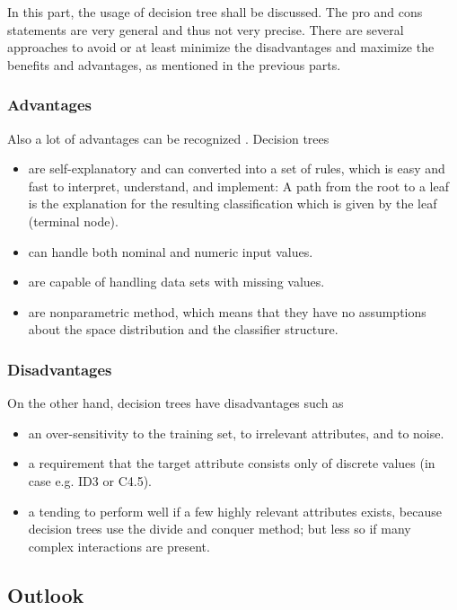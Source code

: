 In this part, the usage of decision tree shall be discussed. The pro and cons statements are very general and thus not very precise. There are several approaches to avoid or at least minimize the disadvantages and maximize the benefits and advantages, as mentioned in the previous parts.


\subsubsection{Advantages}

Also a lot of advantages can be recognized \cite[p. 73ff.]{rokach2008data}. Decision trees
\begin{itemize}
    \item are self-explanatory and can converted into a set of rules, which is easy and fast to interpret, understand, and implement: A path from the root to a leaf is the explanation for the resulting classification which is given by the leaf (terminal node). 
    \item can handle both nominal and numeric input values.
    \item are capable of handling data sets with missing values.
    \item are nonparametric method, which means that they have no assumptions about the space distribution and the classifier structure. 
\end{itemize}


\subsubsection{Disadvantages}
On the other hand, decision trees have disadvantages such as 
\begin{itemize}
    \item an over-sensitivity to the training set, to irrelevant attributes, and to noise.
    \item a requirement that the target attribute consists only of discrete values (in case e.g. ID3 or C4.5).
    \item a tending to perform well if a few highly relevant attributes exists, because decision trees use the divide and conquer method; but less so if many complex interactions are present. 
\end{itemize}






\subsection{Outlook}

